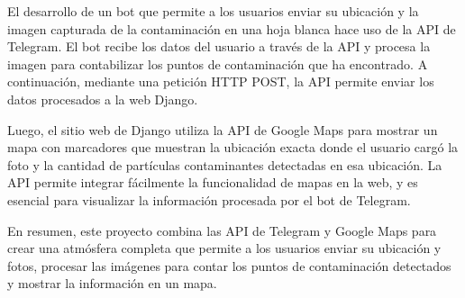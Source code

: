 El desarrollo de un bot que permite a los usuarios enviar su ubicación y la imagen capturada de la contaminación en una hoja blanca hace uso de la API de Telegram. El bot recibe los datos del usuario a través de la API y procesa la imagen para contabilizar los puntos de contaminación que ha encontrado. A continuación, mediante una petición HTTP POST, la API permite enviar los datos procesados a la web Django.

Luego, el sitio web de Django utiliza la API de Google Maps  para mostrar un mapa con marcadores que muestran la ubicación exacta donde el usuario cargó la foto y  la cantidad de partículas contaminantes detectadas en esa ubicación. La API permite integrar fácilmente la funcionalidad de mapas en la web, y es esencial para visualizar la información procesada por el bot de Telegram.


 
 En resumen, este proyecto combina las API de Telegram y Google Maps para crear una atmósfera completa que permite a los usuarios enviar su ubicación y fotos, procesar las imágenes para contar los puntos de contaminación detectados y mostrar la información en un mapa.

